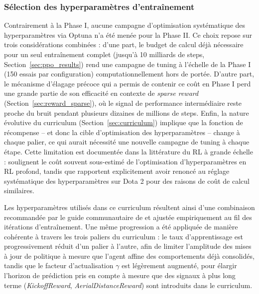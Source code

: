 \subsubsection{Sélection des hyperparamètres d'entraînement}
\label{sec:hp_selection}
Contrairement à la Phase I, aucune campagne d'optimisation systématique des hyperparamètres via Optuna n'a été menée pour la Phase II. Ce choix repose sur trois considérations combinées : d'une part, le budget de calcul déjà nécessaire pour un seul entraînement complet (jusqu'à 10 milliards de steps, Section~\ref{sec:ppo_results}) rend une campagne de tuning à l'échelle 
de la Phase I (150 essais par configuration) computationnellement hors de portée. D'autre part, le mécanisme d'élagage précoce qui a permis de contenir ce coût en Phase I perd une grande partie de son efficacité en contexte de \textit{sparse reward} (Section~\ref{sec:reward_sparse}), où le signal de performance intermédiaire reste proche du bruit pendant plusieurs dizaines de 
millions de steps. Enfin, la nature évolutive du curriculum (Section~\ref{sec:curriculum}) implique que la fonction de récompense -- et donc la cible d'optimisation des hyperparamètres -- change à chaque palier, ce qui aurait nécessité une nouvelle campagne de tuning à chaque étape. 
Cette limitation est documentée dans la littérature du RL à grande échelle : \textcite{eimerHyperparametersReinforcementLearning2023} soulignent le coût souvent sous-estimé de l'optimisation d'hyperparamètres en RL profond, tandis que \textcite{openaiDota2Large2019} rapportent explicitement avoir renoncé au réglage systématique des hyperparamètres sur Dota 2 pour des raisons de coût de calcul similaires.

Les hyperparamètres utilisés dans ce curriculum résultent ainsi d'une combinaison recommandée par le guide communautaire de \textcite{zealanlZealanLRLGymPPOGuide2026} et ajustée empiriquement au fil des itérations d'entraînement. Une même progression a été appliquée de manière cohérente à travers les trois paliers du curriculum : le taux d'apprentissage est progressivement réduit d'un palier à l'autre, afin de limiter l'amplitude des mises à jour de politique à mesure que l'agent affine des comportements déjà consolidés, tandis que le facteur d'actualisation $\gamma$ est légèrement augmenté, pour élargir l'horizon de prédiction pris en compte à mesure que des signaux à plus long terme (\textit{KickoffReward}, \textit{AerialDistanceReward}) sont introduits dans le curriculum.

